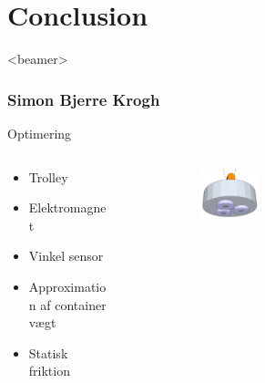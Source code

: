 \section{Conclusion}
\begin{frame}<beamer>
\frametitle{Simon Bjerre Krogh}
\tableofcontents[currentsection]
\end{frame}


\begin{frame}{Optimering}{}

\begin{columns}[T]
\begin{column}{.35\textwidth}

  \begin{itemize}
    \item<1-> Trolley
    \vspace{0.8cm}
    \item<2-> Elektromagnet  
    \vspace{1.5cm}
    \item<3-> Vinkel sensor
    \vspace{1cm}
    \item<4-> Approximation af container vægt 
    \vspace{0.5cm}
    \item<5-> Statisk friktion
  \end{itemize}
\end{column}%
\hfill%
\begin{column}{.65\textwidth}

\begin{figure}[H]
  \centering
{}  \begin{subfigure}{0.98\textwidth}
        \centering
        \includegraphics[width=0.3\textwidth]{Billeder/Electromagnet.png}
        \end{subfigure}



\end{figure}
\end{column}
\end{columns}
\end{frame}
